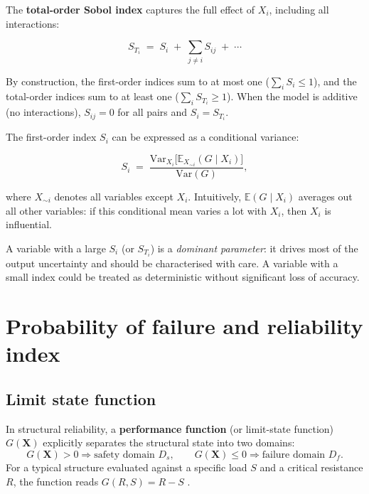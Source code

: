 The \textbf{total-order Sobol index} captures the full effect of $X_i$, including all interactions:

\begin{equation}
    S_{T_i} \;=\; S_i
    \;+\; \sum_{j \neq i} S_{ij}
    \;+\; \cdots
    \label{eq:sobol-total}
\end{equation}

By construction, the first-order indices sum to at most one ($\sum_i S_i \leq 1$), and the total-order indices sum to at least one ($\sum_i S_{T_i} \geq 1$). When the model is additive (no interactions), $S_{ij} = 0$ for all pairs and $S_i = S_{T_i}$.

The first-order index $S_i$ can be expressed as a conditional variance:

\begin{equation}
    S_i \;=\;
    \frac{\mathrm{Var}_{X_i}\bigl[
          \mathbb{E}_{X_{\sim i}}(G \mid X_i)\bigr]}
         {\mathrm{Var}(G)},
    \label{eq:sobol-cond}
\end{equation}

where $X_{\sim i}$ denotes all variables except $X_i$. Intuitively, $\mathbb{E}(G \mid X_i)$ averages out all other variables: if this conditional mean varies a lot with $X_i$, then $X_i$ is influential.

A variable with a large $S_i$ (or $S_{T_i}$) is a \emph{dominant parameter}: it drives most of the output uncertainty and should be characterised with care. A variable with a small index could be treated as deterministic without significant loss of accuracy.

\section{Probability of failure and reliability index} \label{sec:pf-beta}
\subsection{Limit state function} \label{sec:limit-state}
In structural reliability, a \textbf{performance function} (or limit-state function) $G(\mathbf{X})$ explicitly separates the structural state into two domains:
\begin{equation}
    G(\mathbf{X}) > 0 \Rightarrow \text{safety domain } D_s, \qquad G(\mathbf{X}) \leq 0 \Rightarrow \text{failure domain } D_f.
    \label{eq:limit-state}
\end{equation}
For a typical structure evaluated against a specific load $S$ and a critical resistance $R$, the function reads $G(R,S) = R - S$ \cite{baroth2011}.

